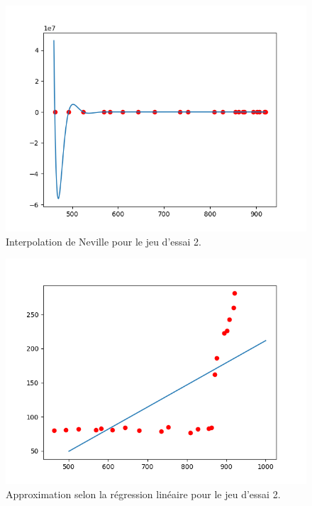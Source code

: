 \documentclass[12pt,french,titlepage]{article}
\begin{document}
		\begin{figure}[H]
		\includegraphics[width=\textwidth]{"22.png"}
		\caption{Interpolation de Neville pour le jeu d'essai 2.}
		\end{figure}
		
		\begin{figure}[H]
		\includegraphics[width=\textwidth]{"23.png"}
		\caption{Approximation selon la régression linéaire pour le jeu d'essai 2.}
		\end{figure}
		
\end{document}
